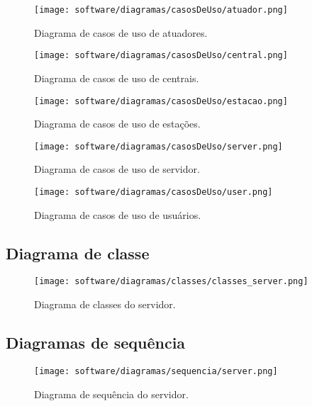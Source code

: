     \begin{figure}[H]
    	\centering
        \texttt{[image: software/diagramas/casosDeUso/atuador.png]}
        \caption{Diagrama de casos de uso de atuadores.}
        \label{fig:atuador}
    \end{figure}
    
    \begin{figure}[H]
        \texttt{[image: software/diagramas/casosDeUso/central.png]}
        \caption{Diagrama de casos de uso de centrais.}
        \label{fig:central}
    \end{figure}

    \begin{figure}[H]
        \texttt{[image: software/diagramas/casosDeUso/estacao.png]}
        \caption{Diagrama de casos de uso de estações.}
        \label{fig:estacao}
    \end{figure}

    \begin{figure}[H]
    	\centering
        \texttt{[image: software/diagramas/casosDeUso/server.png]}
        \caption{Diagrama de casos de uso de servidor.}
        \label{fig:server}
    \end{figure}

    \begin{figure}[H]
        \texttt{[image: software/diagramas/casosDeUso/user.png]}
        \caption{Diagrama de casos de uso de usuários.}
        \label{fig:user}
    \end{figure}
    

    \subsection{Diagrama de classe}
        
    \begin{figure}[H]
        \texttt{[image: software/diagramas/classes/classes\_server.png]}
        \caption{Diagrama de classes do servidor.}
        \label{fig:classes}
    \end{figure}


    \subsection{Diagramas de sequência}

    \begin{figure}[H]
    	\centering
        \texttt{[image: software/diagramas/sequencia/server.png]}
        \caption{Diagrama de sequência do servidor.}
        \label{fig:sequence_server}
    \end{figure}

